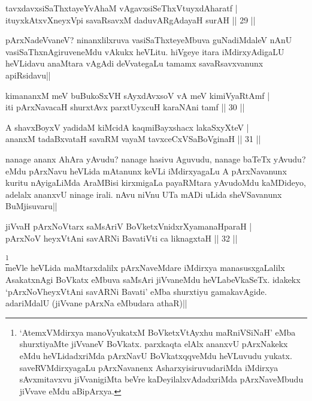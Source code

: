 \begin{shl}
tavxdavxsiSaThxtayeYvAhaM vAgavxsiSeThxVtuyxdAharatf | \\
ituyxkAtxvX\s neyxV\s pi savaRsavxM daduvARgAdayaH surAH \hfill|| 29 || 
\end{shl}

\begin{artha}
pArxNadeVvaneV? ninanxlilxruva vasiSaThxteyeMbuva guNadiMdaleV nAnU 
vasiSaThxnAgiruveneMdu vAkukx heVLitu. hiVgeye itara iMdirxyAdigaLU 
heVLidavu anaMtara vAgAdi deVvategaLu tamamx savaRsavxvanunx 
apiRsidavu||
\end{artha}


\begin{shl}
kimananxM meV buBukoSxVH sAyxdAvxsoV vA meV kimiVyaRtAmf | \\
iti pArxNavacaH shurxtAvx parxtUyxcuH karaNAni tamf \hfill|| 30 || 
\end{shl}

\begin{shl}
A shavxBoyxV yadidaM kiMcidA kaqmiBayxshacx lakaSxyXteV | \\
ananxM tadaBxvataH savaRM vayaM tavxceCxVSaBoVginaH \hfill|| 31 || 
\end{shl}

\begin{artha}
nanage ananx AhAra yAvudu? nanage hasivu Aguvudu, nanage baTeTx 
yAvudu? eMdu pArxNavu heVLida mAtanunx keVLi iMdirxyagaLu A 
pArxNavanunx kuritu nAyigaLiMda AraMBisi kirxmigaLa payaRMtara 
yAvudoMdu kaMDideyo, adelalx ananxvU ninage irali. nAvu niVnu UTa mADi 
uLida sheVSavanunx BuMjisuvaru|| 
\end{artha}


\begin{shl}
jiVvaH pArxNoV\s tarx saMsAriV BoVketxVnidxrXyamanaHparaH | \\
pArxNoV heyxVtAni savARNi BavatiVti ca liknagxtaH \hfill|| 32 || 
\end{shl}

\begin{artha}
\footnote[1]{`AtemxVMdirxya manoVyukatxM BoVketxVtAyxhu maRniVSiNaH' 
eMba shurxtiyaMte jiVvaneV BoVkatx. parxkaqta elAlx ananxvU pArxNakekx 
eMdu heVLidadxriMda pArxNavU BoVkatxqqveMdu heVLuvudu yukatx. 
saveRVMdirxyagaLu pArxNavanenx AsharxyisiruvudariMda iMdirxya 
sAvxmitavxvu jiVvanigiMta beVre kaDeyilalxvAdadxriMda pArxNaveMbudu 
jiVvave eMdu aBipArxya.}\\
meVle heVLida maMtarxdalilx pArxNaveMdare iMdirxya manasusxgaLalilx 
AsakatxnAgi BoVkatx eMbuva saMsAri jiVvaneMdu heVLabeVkaSeTx. idakekx 
`pArxNoVheyxVtAni savARNi Bavati' eMba shurxtiyu gamakavAgide. 
adariMdalU (jiVvane pArxNa eMbudara athaR)||
\end{artha}

